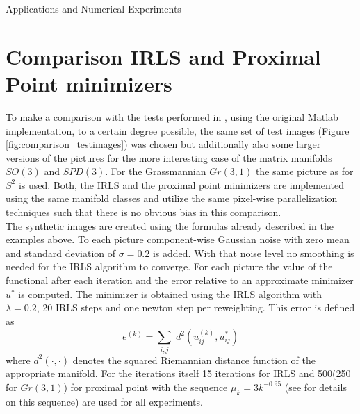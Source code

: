\begin{chapter}{Applications and Numerical Experiments}
\FloatBarrier
\section{Comparison IRLS and Proximal Point minimizers} %
\label{sec:Comparison IRLS and Proximal Point minimizers}

To make a comparison with the tests performed in \cite{SprecherIRLS}, using the original Matlab implementation, to a certain degree possible,  the same set of test images (Figure \ref{fig:comparison_testimages}) was chosen but additionally also some larger versions of the pictures for the more interesting 
case of the matrix manifolds $SO(3)$ and $SPD(3)$. For the Grassmannian $Gr(3,1)$ the same picture as
for $S^2$ is used.
Both, the IRLS and the proximal point minimizers are implemented using the same manifold classes and utilize the
same pixel-wise parallelization techniques such that there is no obvious bias in this comparison.\\

The synthetic images are created using the formulas already described in the examples above. To each picture component-wise Gaussian noise with zero mean and
standard deviation of $\sigma=0.2$ is added. With that noise level no smoothing is needed for the IRLS algorithm to converge. 
For each picture the value of the functional after each iteration and the error relative to an approximate minimizer $u^*$ is computed.
The minimizer is obtained using the IRLS algorithm with $\lambda=0.2$, 20 IRLS steps and one newton step per reweighting. This error is defined as
\begin{equation}
e^{(k)}=\sum_{i,j}\;d^2(u^{(k)}_{ij},u^*_{ij})
\end{equation}
where $d^2(\cdot,\cdot)$ denotes the squared Riemannian distance function of the appropriate manifold. For the iterations itself 15 iterations for IRLS and 500(250 for $Gr(3,1)$) for proximal point with
the sequence $\mu_k=3k^{-0.95}$ (see \cite{Weinmann} for details on this sequence) are used for all experiments. \\


\end{chapter}
